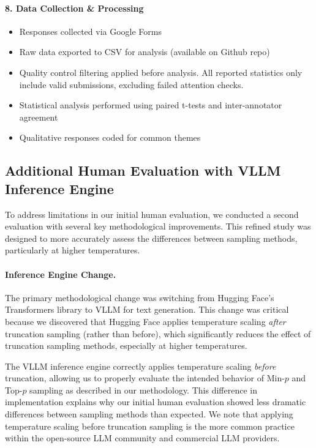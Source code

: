 \documentclass{article}
\begin{document}
\paragraph{8. Data Collection \& Processing}
\begin{itemize}
    \item Responses collected via Google Forms
    \item Raw data exported to CSV for analysis (available on Github repo)
    \item Quality control filtering applied before analysis. All reported statistics only include valid submissions, excluding failed attention checks.
    \item Statistical analysis performed using paired t-tests and inter-annotator agreement
    \item Qualitative responses coded for common themes
\end{itemize}

\subsection{Additional Human Evaluation with VLLM Inference Engine}
\label{app:vllm_human_eval}

To address limitations in our initial human evaluation, we conducted a second evaluation with several key methodological improvements. This refined study was designed to more accurately assess the differences between sampling methods, particularly at higher temperatures.

\paragraph{Inference Engine Change.} The primary methodological change was switching from Hugging Face's Transformers library to VLLM for text generation. This change was critical because we discovered that Hugging Face applies temperature scaling \textit{after} truncation sampling (rather than before), which significantly reduces the effect of truncation sampling methods, especially at higher temperatures. 

The VLLM inference engine correctly applies temperature scaling \textit{before} truncation, allowing us to properly evaluate the intended behavior of Min-\(p\) and Top-\(p\) sampling as described in our methodology. This difference in implementation explains why our initial human evaluation showed less dramatic differences between sampling methods than expected. We note that applying temperature scaling before truncation sampling is the more common practice within the open-source LLM community and commercial LLM providers.
\end{document}
